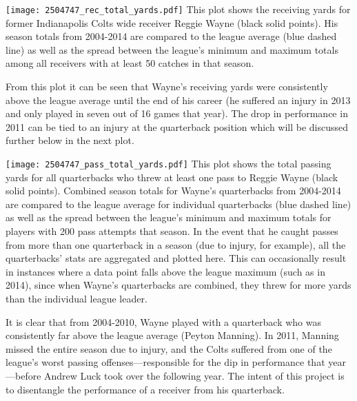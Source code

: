 \documentclass{article}
\begin{document}
\texttt{[image: 2504747\_rec\_total\_yards.pdf]}
This plot shows the receiving yards for former Indianapolis Colts wide receiver Reggie Wayne (black solid points).  
His season totals from 2004-2014 are compared to the league average (blue dashed line) as well as the spread between the league's minimum and maximum totals among all receivers with at least 50 catches in that season.  

From this plot it can be seen that Wayne's receiving yards were consistently above the league average until the end of his career (he suffered an injury in 2013 and only played in seven out of 16 games that year).  
The drop in performance in 2011 can be tied to an injury at the quarterback position which will be discussed further below in the next plot.  

\newpage
\texttt{[image: 2504747\_pass\_total\_yards.pdf]}
This plot shows the total passing yards for all quarterbacks who threw at least one pass to Reggie Wayne (black solid points). 
Combined season totals for Wayne's quarterbacks from 2004-2014 are compared to the league average for individual quarterbacks (blue dashed line) as well as the spread between the league's minimum and maximum totals for players with 200 pass attempts that season.  
In the event that he caught passes from more than one quarterback in a season (due to injury, for example), all the quarterbacks' stats are aggregated and plotted here.
This can occasionally result in instances where a data point falls above the league maximum (such as in 2014), since when Wayne's quarterbacks are combined, they threw for more yards than the individual league leader.

It is clear that from 2004-2010, Wayne played with a quarterback who was consistently far above the league average (Peyton Manning).
In 2011, Manning missed the entire season due to injury, and the Colts suffered from one of the league's worst passing offenses---responsible for the dip in performance that year---before Andrew Luck took over the following year.
The intent of this project is to disentangle the performance of a receiver from his quarterback.
\end{document}
